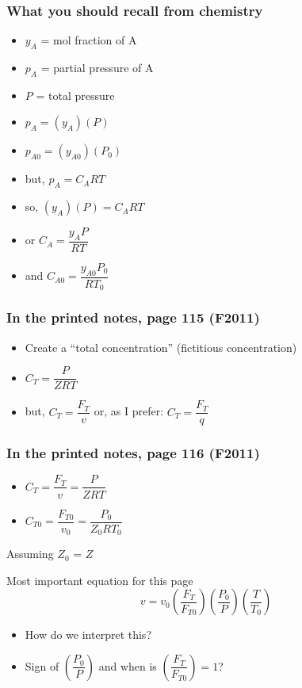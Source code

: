 \begin{frame}\frametitle{What you should recall from chemistry}
	\begin{itemize}
		\item	$y_{A}$ = mol fraction of A
		\item	$p_A$ = partial pressure of A
		\item	$P$ = total pressure
		\item	$p_A = (y_A) (P)$ {\footnotesize\hfill {\color{myOrange}{$\leftarrow$ applies anywhere along the reactor}}}
		\item	$p_{A0} = (y_{A0})(P_0)$ {\footnotesize\hfill {\color{myOrange}{$\leftarrow$ applies only at the feed point}}}
		\item	but, $p_A = C_A RT$
		\item	so, $(y_A) (P) = C_A RT$
		\item	or $C_A = \dfrac{y_A P}{RT}$ {\footnotesize\hfill {\color{myOrange}{$\leftarrow$ applies anywhere along the reactor}}}
		\item	and $C_{A0} = \dfrac{y_{A0} P_0}{RT_0}$ {\footnotesize\hfill {\color{myOrange}{$\leftarrow$ applies only at the feed point}}}
	\end{itemize}
\end{frame}

\begin{frame}\frametitle{In the printed notes, page 115 (F2011)}
	\begin{itemize}
		\item	Create a ``total concentration'' {\scriptsize (fictitious concentration)}
		\item	$C_T = \dfrac{P}{ZRT}$
		\item	but, $C_T = \dfrac{F_T}{v}$ or, as I prefer: $C_T = \dfrac{F_T}{q}$
	\end{itemize}
\end{frame}

\begin{frame}\frametitle{In the printed notes, page 116 (F2011)}
	\begin{itemize}
		\item	$C_T = \dfrac{F_T}{v} = \dfrac{P}{ZRT}$ {\footnotesize\hfill {\color{myOrange}{$\leftarrow$ applies anywhere along the reactor}}}
		\item	$C_{T0} = \dfrac{F_{T0}}{v_0} = \dfrac{P_0}{Z_0RT_0}$ {\footnotesize\hfill {\color{myOrange}{$\leftarrow$ applies only at the feed point}}}
	\end{itemize}
	Assuming $Z_0$ = $Z$
	\begin{exampleblock}{Most important equation for this page}
		$$v = v_0 \left(\dfrac{F_T}{F_{T0}}\right)\left(\dfrac{P_0}{P}\right)\left(\dfrac{T}{T_{0}}\right)$$
	\end{exampleblock}
	\begin{itemize}
		\item	How do we interpret this?
		\item	Sign of $\left(\dfrac{P_0}{P}\right)$ and when is $\left(\dfrac{F_T}{F_{T0}}\right)=1$?
	\end{itemize}
	
\end{frame}

